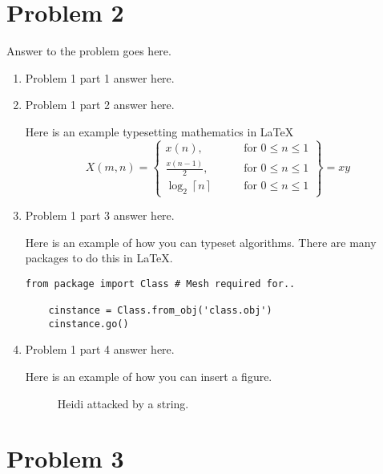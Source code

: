 \documentclass[12pt,letterpaper]{article}
\begin{document}
\section*{Problem 2}

Answer to the problem goes here.

\begin{enumerate}
  \item
   Problem 1 part 1 answer here.
  \item
    Problem 1 part 2 answer here.

    Here is an example typesetting mathematics in \LaTeX
\begin{equation*}
    X(m,n) = \left\{\begin{array}{lr}
        x(n), & \text{for } 0\leq n\leq 1\\
        \frac{x(n-1)}{2}, & \text{for } 0\leq n\leq 1\\
        \log_2 \left\lceil n \right\rceil \qquad & \text{for } 0\leq n\leq 1
        \end{array}\right\} = xy
\end{equation*}

    \item Problem 1 part 3 answer here.

    Here is an example of how you can typeset algorithms.
    There are many packages to do this in \LaTeX.
     
     \begin{lstlisting}[style = Python]
    from package import Class # Mesh required for..
    
    cinstance = Class.from_obj('class.obj')
    cinstance.go()
    \end{lstlisting}
     
  \item Problem 1 part 4 answer here.

    Here is an example of how you can insert a figure.
    \begin{figure}[!h]
    \centering
    \caption{Heidi attacked by a string.}
    \end{figure}
\end{enumerate}


\section*{Problem 3}
\end{document}
